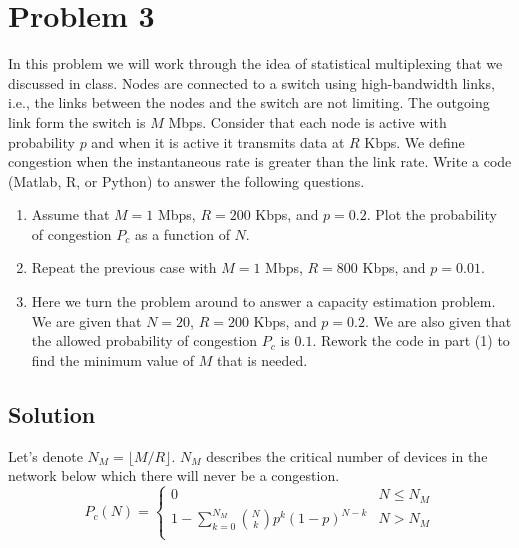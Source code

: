 
\section*{Problem 3}

In this problem we will work through the idea of statistical multiplexing that we discussed in class.
Nodes are connected to a switch using high-bandwidth links, i.e., the links between the nodes and the switch are not
limiting.
The outgoing link form the switch is $M$ Mbps.
Consider that each node is active with probability $p$ and when it is active it transmits data at $R$ Kbps.
We define congestion when the instantaneous rate is greater than the link rate.
Write a code (Matlab, R, or Python) to answer the following questions.

\begin{enumerate}
      \item Assume that $M = 1$ Mbps, $R = 200$ Kbps, and $p = 0.2$.
            Plot the probability of congestion $P_c$ as a
            function of $N$.
      \item Repeat the previous case with $M = 1$ Mbps, $R = 800$ Kbps, and $p = 0.01$.
      \item Here we turn the problem around to answer a capacity estimation problem.
            We are given that $N = 20$, $R = 200$ Kbps, and $p = 0.2$.
            We are also given that the allowed probability of congestion $P_c$ is $0.1$.
            Rework the code in part (1) to find the minimum value of $M$ that is needed.
\end{enumerate}

\subsection*{Solution}

Let's denote $N_M = \lfloor M / R \rfloor$.
$N_M$ describes the critical number of devices in the network below which there will never be a congestion.
\[
      P_c(N) = \left\{ \begin{array}{ll}
            0                                                      & N \le N_M \\
            1 - \sum_{k=0}^{N_M} {{N} \choose {k}} p^k (1-p)^{N-k} & N > N_M   \\
      \end{array}
      \right.
\]

